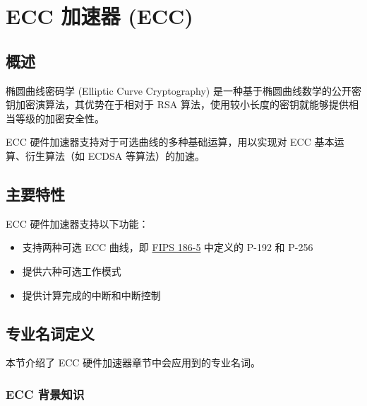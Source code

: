 \documentclass[main\_\_CN.tex]{subfiles}
\begin{document}

\ifglobal
\else
    {\let\clearpage\relax \listoftodos}
    {\let\clearpage\relax \listofdonetodos}
    \tableofcontents
\fi



\hypertarget{ecc}{}
\chapter{ECC 加速器 (ECC)}
\label{mod:ecc}

\section{概述}
椭圆曲线密码学 (Elliptic Curve Cryptography) 是一种基于椭圆曲线数学的公开密钥加密演算法，其优势在于相对于 RSA 算法，使用较小长度的密钥就能够提供相当等级的加密安全性。

\chipname{} ECC 硬件加速器支持对于可选曲线的多种基础运算，用以实现对 ECC 基本运算、衍生算法（如 ECDSA 等算法）的加速。

\section{主要特性}
\chipname{} ECC 硬件加速器支持以下功能：

\begin{itemize}
    \item 支持两种可选 ECC 曲线，即 \href{https://nvlpubs.nist.gov/nistpubs/FIPS/NIST.FIPS.186-5.pdf}{FIPS 186-5} 中定义的 P-192 和 P-256
    \item 提供六种可选工作模式
    \item 提供计算完成的中断和中断控制
\end{itemize}

\section{专业名词定义}
本节介绍了 ECC 硬件加速器章节中会应用到的专业名词。

\subsection{ECC 背景知识}
\end{document}

